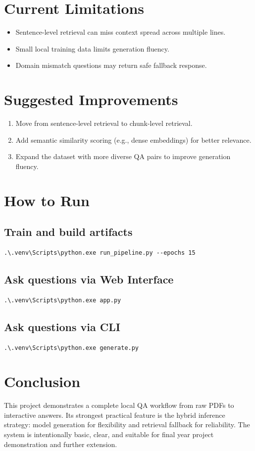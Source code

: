 \documentclass[a4paper,11pt]{article}
\begin{document}
\section{Current Limitations}
\begin{itemize}[leftmargin=1.5em]
    \item Sentence-level retrieval can miss context spread across multiple lines.
    \item Small local training data limits generation fluency.
    \item Domain mismatch questions may return safe fallback response.
\end{itemize}

\section{Suggested Improvements}
\begin{enumerate}[leftmargin=1.5em]
    \item Move from sentence-level retrieval to chunk-level retrieval.
    \item Add semantic similarity scoring (e.g., dense embeddings) for better relevance.
    \item Expand the dataset with more diverse QA pairs to improve generation fluency.
\end{enumerate}

\section{How to Run}
\subsection{Train and build artifacts}
\begin{verbatim}
.\.venv\Scripts\python.exe run_pipeline.py --epochs 15
\end{verbatim}

\subsection{Ask questions via Web Interface}
\begin{verbatim}
.\.venv\Scripts\python.exe app.py
\end{verbatim}

\subsection{Ask questions via CLI}
\begin{verbatim}
.\.venv\Scripts\python.exe generate.py
\end{verbatim}

\section{Conclusion}
This project demonstrates a complete local QA workflow from raw PDFs to interactive answers.
Its strongest practical feature is the hybrid inference strategy:
model generation for flexibility and retrieval fallback for reliability.
The system is intentionally basic, clear, and suitable for final year project demonstration and further extension.
\end{document}
